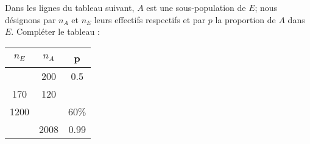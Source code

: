 
\begin{exercice}\label{exoPremiere-0012}

    Dans les lignes du tableau suivant, \( A\) est une sous-population de \( E\); nous désignons par \( n_A\) et \( n_E\) leurs effectifs respectifs et par \( p\) la proportion de \( A\) dans \( E\). Compléter le tableau :
    \begin{center}
    \begin{tabular}{|c|c|c|}
        \hline
        \( n_E\)&\( n_A\)&p\\
        \hline\hline
        &200&0.5\\
        \hline
        170&120&\\
        \hline
        1200&&60\%\\
        \hline
        &2008&0.99\\
        \hline
    \end{tabular}
    \end{center}

\end{exercice}
